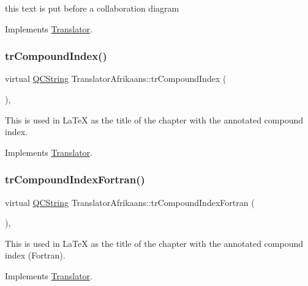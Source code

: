 this text is put before a collaboration diagram 

Implements \mbox{\hyperlink{class_translator}{Translator}}.

\mbox{\label{class_translator_afrikaans_a21d28db62f78e7f457adf8226aec4502}} 
\subsubsection{\texorpdfstring{trCompoundIndex()}{trCompoundIndex()}}
{\footnotesize\ttfamily virtual \mbox{\hyperlink{class_q_c_string}{Q\+C\+String}} Translator\+Afrikaans\+::tr\+Compound\+Index (\begin{DoxyParamCaption}{ }\end{DoxyParamCaption})\hspace{0.3cm}{\ttfamily [inline]}, {\ttfamily [virtual]}}

This is used in La\+TeX as the title of the chapter with the annotated compound index. 

Implements \mbox{\hyperlink{class_translator}{Translator}}.

\mbox{\label{class_translator_afrikaans_aaa41b8bddc2fefc291a528f1e4e2b8cc}} 
\subsubsection{\texorpdfstring{trCompoundIndexFortran()}{trCompoundIndexFortran()}}
{\footnotesize\ttfamily virtual \mbox{\hyperlink{class_q_c_string}{Q\+C\+String}} Translator\+Afrikaans\+::tr\+Compound\+Index\+Fortran (\begin{DoxyParamCaption}{ }\end{DoxyParamCaption})\hspace{0.3cm}{\ttfamily [inline]}, {\ttfamily [virtual]}}

This is used in La\+TeX as the title of the chapter with the annotated compound index (Fortran). 

Implements \mbox{\hyperlink{class_translator}{Translator}}.

